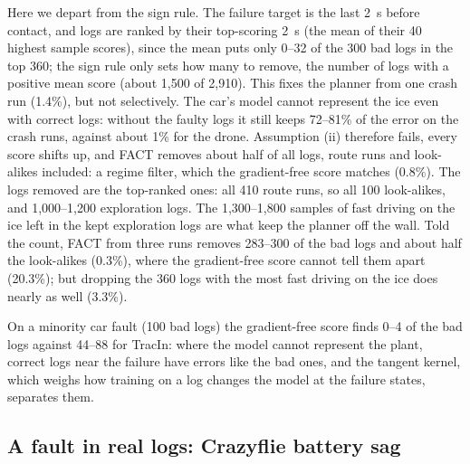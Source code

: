 \documentclass[preprint,12pt]{elsarticle}
\newcommand{\method}{FACT}
\begin{document}
Here we depart from the sign rule. The failure target is the last 2~s before contact, and logs are ranked by their top-scoring 2~s (the mean of their 40 highest sample scores), since the mean puts only 0--32 of the 300 bad logs in the top 360; the sign rule only sets how many to remove, the number of logs with a positive mean score (about 1,500 of 2,910). This fixes the planner from one crash run (1.4\%), but not selectively. The car's model cannot represent the ice even with correct logs: without the faulty logs it still keeps 72--81\% of the error on the crash runs, against about 1\% for the drone. Assumption (ii) therefore fails, every score shifts up, and \method{} removes about half of all logs, route runs and look-alikes included: a regime filter, which the gradient-free score matches (0.8\%). The logs removed are the top-ranked ones: all 410 route runs, so all 100 look-alikes, and 1,000--1,200 exploration logs. The 1,300--1,800 samples of fast driving on the ice left in the kept exploration logs are what keep the planner off the wall. Told the count, \method{} from three runs removes 283--300 of the bad logs and about half the look-alikes (0.3\%), where the gradient-free score cannot tell them apart (20.3\%); but dropping the 360 logs with the most fast driving on the ice does nearly as well (3.3\%).

On a minority car fault (100 bad logs) the gradient-free score finds 0--4 of the bad logs against 44--88 for TracIn: where the model cannot represent the plant, correct logs near the failure have errors like the bad ones, and the tangent kernel, which weighs how training on a log changes the model at the failure states, separates them.

\subsection{A fault in real logs: Crazyflie battery sag}\label{sec:cf}
\end{document}
